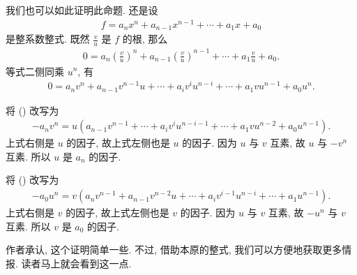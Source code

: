 \begin{remark}
    我们也可以如此证明此命题. 还是设
    \begin{align*}
        f = a_n x^n + a_{n-1} x^{n-1} + \cdots + a_1 x + a_0
    \end{align*}
    是整系数整式. 既然 $\frac{v}{u}$ 是 $f$ 的根, 那么
    \begin{align*}
        0 = a_n \left( \frac{v}{u} \right)^n + a_{n-1} \left( \frac{v}{u} \right)^{n-1} + \cdots + a_1 \frac{v}{u} + a_0.
    \end{align*}
    等式二侧同乘 $u^n$, 有
    \begin{align*}
        0 = a_n v^n + a_{n-1} v^{n-1} u + \cdots + a_{i} v^{i} u^{n-i} + \cdots + a_1 v u^{n-1} + a_0 u^n. \tag*{(\myStar)}
    \end{align*}

    将 (\myStar) 改写为
    \begin{align*}
        -a_n v^n = u (a_{n-1} v^{n-1} + \cdots + a_{i} v^{i} u^{n-i-1} + \cdots + a_1 v u^{n-2} + a_0 u^{n-1}).
    \end{align*}
    上式右侧是 $u$ 的因子, 故上式左侧也是 $u$ 的因子. 因为 $u$ 与 $v$ 互素, 故 $u$ 与 $-v^n$ 互素. 所以 $u$ 是 $a_n$ 的因子.

    将 (\myStar) 改写为
    \begin{align*}
        -a_0 u^n = v (a_n v^{n-1} + a_{n-1} v^{n-2} u + \cdots + a_{i} v^{i-1} u^{n-i} + \cdots + a_1 u^{n-1}).
    \end{align*}
    上式右侧是 $v$ 的因子, 故上式左侧也是 $v$ 的因子. 因为 $u$ 与 $v$ 互素, 故 $-u^n$ 与 $v$ 互素. 所以 $v$ 是 $a_0$ 的因子.

    作者承认, 这个证明简单一些. 不过, 借助本原的整式, 我们可以方便地获取更多情报. 读者马上就会看到这一点.
\end{remark}

